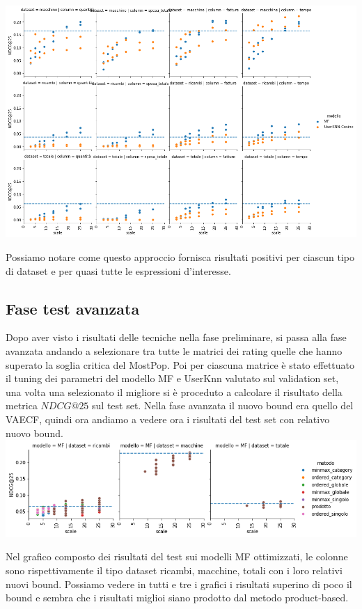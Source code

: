 \includegraphics[width=16cm]{figures/prodotto.png}

Possiamo notare come questo approccio fornisca risultati positivi per ciascun tipo di dataset e per quasi tutte le espressioni d'interesse.

\subsection{Fase test avanzata}
Dopo aver visto i risultati delle tecniche nella fase preliminare, si passa alla fase avanzata andando a selezionare tra tutte le matrici dei rating quelle che hanno superato la soglia critica del MostPop. Poi per ciascuna matrice è stato effettuato il tuning dei parametri del modello MF e UserKnn valutato sul validation set, una volta una selezionato il migliore si è proceduto a calcolare il risultato della metrica $NDCG@25$ sul test set.
Nella fase avanzata il nuovo bound era quello del VAECF, quindi ora andiamo a vedere ora i risultati del test set con relativo nuovo bound.\\

\includegraphics[width=16cm]{figures/validazione_mf.png}

Nel grafico composto dei risultati del test sui modelli MF ottimizzati, le colonne sono rispettivamente il tipo dataset ricambi, macchine, totali con i loro relativi nuovi bound. Possiamo vedere in tutti e tre i grafici i risultati superino di poco il bound e sembra che i risultati miglioi siano prodotto dal metodo product-based.\\


